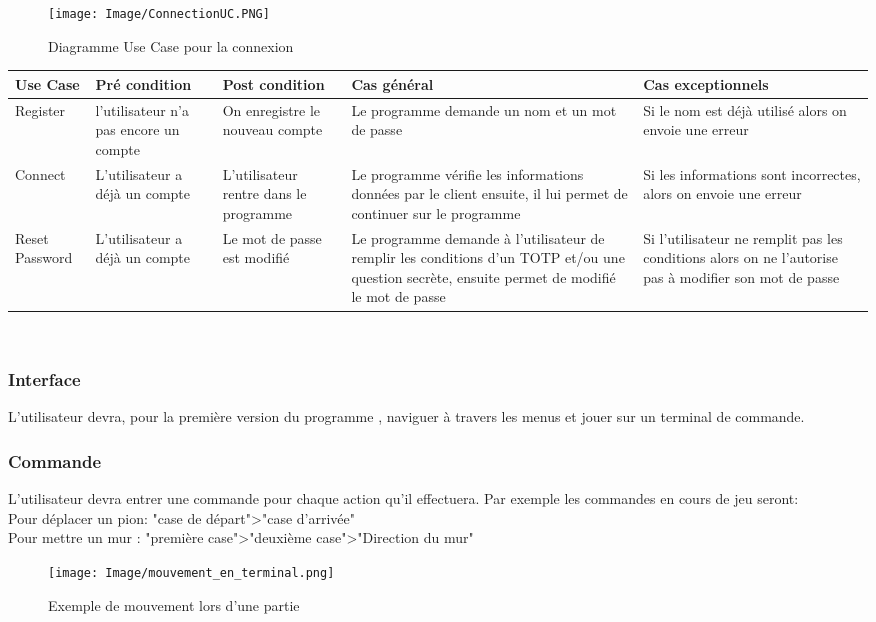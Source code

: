 \documentclass[french, utf8]{article}
\begin{document}
\begin{figure}[ht]
     \centering
    \texttt{[image: Image/ConnectionUC.PNG]}
\caption{Diagramme Use Case pour la connexion}
\end{figure}
\begin{center}
\begin{tabular}{|m{3cm}|m{3cm}|m{3cm}|m{3cm}|m{3cm}|}
\hline  Use Case & Pré condition      &  Post condition  & Cas général & Cas exceptionnels\\
\hline Register& l'utilisateur n'a pas encore un compte & On enregistre le nouveau compte & Le programme demande un nom et un mot de passe & Si le nom est déjà utilisé alors on envoie une erreur  \\
\hline Connect  & L'utilisateur a déjà un compte & L'utilisateur rentre dans le programme & Le programme vérifie les informations données par le client ensuite, il lui permet de continuer sur le programme & Si les informations sont incorrectes, alors on envoie une erreur \\
\hline Reset Password  & L'utilisateur a déjà un compte & Le mot de passe est modifié & Le programme demande à l'utilisateur de remplir les conditions d'un TOTP et/ou une question secrète, ensuite permet de modifié le mot de passe & Si l'utilisateur ne remplit pas les conditions alors on ne l'autorise pas à modifier son mot de passe \\
\hline
\end{tabular}\\
\end{center}
\subsubsection{Interface}
L'utilisateur devra, pour la première version du programme , naviguer à travers les menus et jouer sur un terminal de commande. \newline

\subsubsection{Commande}
L'utilisateur devra entrer une commande pour chaque action qu'il effectuera.
Par exemple les commandes en cours de jeu seront:\\
Pour déplacer un pion: "case de départ">"case d'arrivée"\\
Pour mettre un mur : "première case">"deuxième case">"Direction du mur"
\begin{figure}[ht]
     \centering
    \texttt{[image: Image/mouvement\_en\_terminal.png]}
    \caption{Exemple de mouvement lors d'une partie}
\end{figure}
\end{document}
